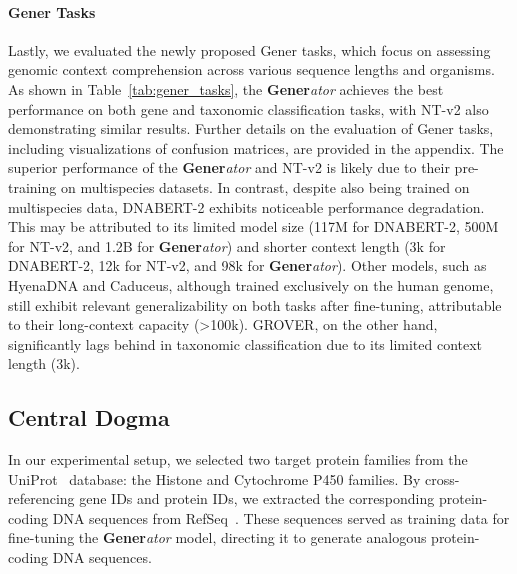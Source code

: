 \paragraph{Gener Tasks} 
Lastly, we evaluated the newly proposed Gener tasks, which focus on assessing genomic context comprehension across various sequence lengths and organisms. As shown in Table~\ref{tab:gener_tasks}, the \textbf{Gener}\textit{ator} achieves the best performance on both gene and taxonomic classification tasks, with NT-v2 also demonstrating similar results. Further details on the evaluation of Gener tasks, including visualizations of confusion matrices, are provided in the appendix. The superior performance of the \textbf{Gener}\textit{ator} and NT-v2 is likely due to their pre-training on multispecies datasets. In contrast, despite also being trained on multispecies data, DNABERT-2 exhibits noticeable performance degradation. This may be attributed to its limited model size (117M for DNABERT-2, 500M for NT-v2, and 1.2B for \textbf{Gener}\textit{ator}) and shorter context length (3k for DNABERT-2, 12k for NT-v2, and 98k for \textbf{Gener}\textit{ator}). Other models, such as HyenaDNA and Caduceus, although trained exclusively on the human genome, still exhibit relevant generalizability on both tasks after fine-tuning, attributable to their long-context capacity (\textgreater 100k). GROVER, on the other hand, significantly lags behind in taxonomic classification due to its limited context length (3k).






\subsection{Central Dogma}

In our experimental setup, we selected two target protein families from the UniProt~\cite{UniProt} database: the Histone and Cytochrome P450 families. By cross-referencing gene IDs and protein IDs, we extracted the corresponding protein-coding DNA sequences from RefSeq~\cite{RefSeq}. These sequences served as training data for fine-tuning the \textbf{Gener}\textit{ator} model, directing it to generate analogous protein-coding DNA sequences.

